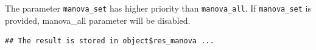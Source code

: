 \documentclass[
]{book}
\newenvironment{Shaded}{\begin{snugshade}}{\end{snugshade}}
\newcommand{\AttributeTok}[1]{\textcolor[rgb]{0.77,0.63,0.00}{#1}}
\newcommand{\CommentTok}[1]{\textcolor[rgb]{0.56,0.35,0.01}{\textit{#1}}}
\newcommand{\FunctionTok}[1]{\textcolor[rgb]{0.00,0.00,0.00}{#1}}
\newcommand{\NormalTok}[1]{#1}
\newcommand{\SpecialCharTok}[1]{\textcolor[rgb]{0.00,0.00,0.00}{#1}}
\newcommand{\StringTok}[1]{\textcolor[rgb]{0.31,0.60,0.02}{#1}}
\begin{document}
The parameter \texttt{manova\_set} has higher priority than \texttt{manova\_all}. If \texttt{manova\_set} is provided, manova\_all parameter will be disabled.

\begin{Shaded}
\end{Shaded}

\begin{verbatim}
## The result is stored in object$res_manova ...
\end{verbatim}
\end{document}
